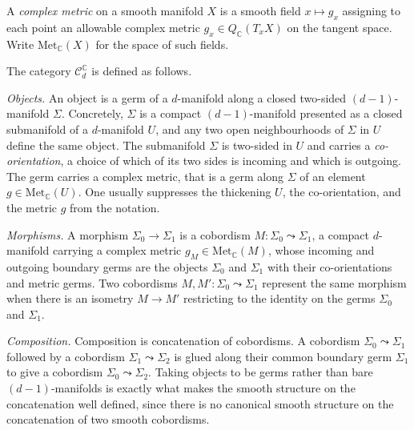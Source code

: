 \begin{definition}
  \label{def:cobordism-category}
  \leanok
  A \emph{complex metric} on a smooth manifold $X$ is a smooth field
  $x \mapsto g_x$ assigning to each point an allowable complex metric
  $g_x \in Q_{\mathbb C}(T_x X)$ on the tangent space. Write
  $\mathrm{Met}_{\mathbb C}(X)$ for the space of such fields.

  The category $\mathcal C_d^{\mathbb C}$ is defined as follows.

  \emph{Objects.} An object is a germ of a $d$-manifold along a closed
  two-sided $(d-1)$-manifold $\Sigma$. Concretely, $\Sigma$ is a compact
  $(d-1)$-manifold presented as a closed submanifold of a $d$-manifold $U$,
  and any two open neighbourhoods of $\Sigma$ in $U$ define the same object.
  The submanifold $\Sigma$ is two-sided in $U$ and carries a
  \emph{co-orientation}, a choice of which of its two sides is incoming and
  which is outgoing. The germ carries a complex metric, that is a germ along
  $\Sigma$ of an element $g \in \mathrm{Met}_{\mathbb C}(U)$. One usually
  suppresses the thickening $U$, the co-orientation, and the metric $g$ from
  the notation.

  \emph{Morphisms.} A morphism $\Sigma_0 \to \Sigma_1$ is a cobordism
  $M : \Sigma_0 \leadsto \Sigma_1$, a compact $d$-manifold carrying a complex
  metric $g_M \in \mathrm{Met}_{\mathbb C}(M)$, whose incoming and outgoing
  boundary germs are the objects $\Sigma_0$ and $\Sigma_1$ with their
  co-orientations and metric germs. Two cobordisms
  $M, M' : \Sigma_0 \leadsto \Sigma_1$ represent the same morphism when there
  is an isometry $M \to M'$ restricting to the identity on the germs
  $\Sigma_0$ and $\Sigma_1$.

  \emph{Composition.} Composition is concatenation of cobordisms. A cobordism
  $\Sigma_0 \leadsto \Sigma_1$ followed by a cobordism
  $\Sigma_1 \leadsto \Sigma_2$ is glued along their common boundary germ
  $\Sigma_1$ to give a cobordism $\Sigma_0 \leadsto \Sigma_2$. Taking objects
  to be germs rather than bare $(d-1)$-manifolds is exactly what makes the
  smooth structure on the concatenation well defined, since there is no
  canonical smooth structure on the concatenation of two smooth cobordisms.


\end{definition}
